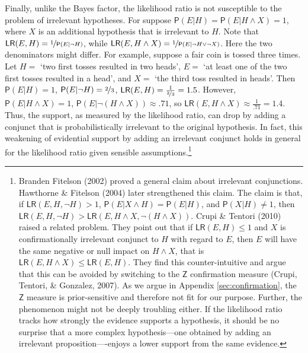 \documentclass[
  letterpaper,
  DIV=11,
  numbers=noendperiod]{scrartcl}
\newcommand{\n}{\neg}
\newcommand{\et}{\wedge}
\newcommand{\pr}[1]{\mathsf{P}(#1)}
\begin{document}
Finally, unlike the Bayes factor, the likelihood ratio is not
susceptible to the problem of irrelevant hypotheses. For suppose
\(\pr{E\vert H} = \pr{E\vert H \et X} = 1\), where \(X\) is an
additional hypothesis that is irrelevant to \(H\). Note that
\(\mathsf{LR}(E,H) = \nicefrac{1}{\pr{E \vert \n H}}\), while
\(\mathsf{LR}(E, H \et X) = \nicefrac{1}{\pr{E \vert \n H \vee \n X}}\).
Here the two denominators might differ. For example, suppose a fair coin
is tossed three times. Let \(H=\) `two first tosses resulted in two
heads', \(E=\) `at least one of the two first tosses resulted in a
head', and \(X=\) `the third toss resulted in heads'. Then
\(\pr{E \vert H} =1\), \(\pr{E\vert \n H} = \nicefrac{2}{3}\),
\(\mathsf{LR}(E,H) = \frac{1}{\nicefrac{2}{3}} = 1.5\). However,
\(\pr{E\vert H \et X} =1\), \(\pr{E \vert \n (H \et X)} \approx .71\),
so \(\mathsf{LR}(E,H \et X) \approx \frac{1}{.71} = 1.4\). Thus, the
support, as measured by the likelihood ratio, can drop by adding a
conjunct that is probabilistically irrelevant to the original
hypothesis. In fact, this weakening of evidential support by adding an
irrelevant conjunct holds in general for the likelihood ratio given
sensible assumptions.\footnote{Branden Fitelson (2002) proved a general
  claim about irrelevant conjunctions. Hawthorne \& Fitelson (2004)
  later strengthened this claim. The claim is that, if
  \(\mathsf{LR}(E,H,\n H)>1\),
  \(\pr{E \vert X \et H} = \pr{E \vert H}\), and
  \(\pr{X \vert H} \neq 1\), then
  \(\mathsf{LR}(E,H,\n H) > \mathsf{LR}(E,H \et X,\n(H \et X))\). Crupi
  \& Tentori (2010) raised a related problem. They point out that if
  \(\mathsf{LR}(E,H)\leq 1\) and \(X\) is confirmationally irrelevant
  conjunct to \(H\) with regard to \(E\), then \(E\) will have the same
  negative or null impact on \(H \et X\), that is
  \(\mathsf{LR}(E,H \et X ) \leq \mathsf{LR}(E,H)\). They find this
  counter-intuitive and argue that this can be avoided by switching to
  the \(\mathsf{Z}\) confirmation measure (Crupi, Tentori, \& Gonzalez,
  2007). As we argue in Appendix \ref{sec:confirmation}, the
  \(\mathsf{Z}\) measure is prior-sensitive and therefore not fit for
  our purpose. Further, the phenomenon might not be deeply troubling
  either. If the likelihood ratio tracks how strongly the evidence
  supports a hypothesis, it should be no surprise that a more complex
  hypothesis---one obtained by adding an irrelevant
  proposition----enjoys a lower support from the same evidence.}

\vspace{1mm}
\footnotesize
\end{document}
